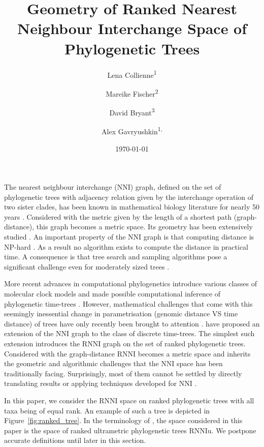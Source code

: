 \documentclass{amsart}
\title[Ranked Nearest Neighbour Intarchange]{Geometry of Ranked Nearest Neighbour Interchange Space of Phylogenetic Trees}
\date{\today}
\author{Lena Collienne\textsuperscript{1}}
\author{Mareike Fischer\textsuperscript{2}}
\author{David Bryant\textsuperscript{3}}
\author{Alex Gavryushkin\textsuperscript{1, \Letter}}
\newcommand{\nni}{\mathrm{NNI}}
\newcommand{\rnni}{\mathrm{RNNI}}
\newcommand{\rnniu}{\mathrm{RNNIu}}
\begin{document}
\maketitle

\begin{abstract}

\end{abstract}

The nearest neighbour interchange ($\nni$) graph, defined on the set of phylogenetic trees with adjacency relation given by the interchange operation of two sister clades, has been known in mathematical biology literature for nearly 50 years \autocite{Robinson1971-ql,Moore1973-kk}.
Considered with the metric given by the length of a shortest path (graph-distance), this graph becomes a metric space.
Its geometry has been extensively studied \autocite{Dasgupta2000-xa, Li1996-zw, Gordon2013-fw, De_Jong2016-al}.
An important property of the $\nni$ graph is that computing distance is NP-hard \autocite{Dasgupta2000-xa}.
As a result no algorithm exists to compute the distance in practical time.
A consequence is that tree search and sampling algorithms pose a significant challenge even for moderately sized trees \autocite{...}.

More recent advances in computational phylogenetics introduce various classes of molecular clock models \autocite{Yoder2000-ks,Drummond2006-nl,Drummond2010-yf} and made possible computational inference of phylogenetic time-trees \autocite{...}.
However, mathematical challenges that come with this seemingly inessential change in parametrisation (genomic distance VS time distance) of trees have only recently been brought to attention \autocite{Gavryushkin2016-uu}.
\textcite{Gavryushkin2018-ol} have proposed an extension of the $\nni$ graph to the class of discrete time-trees.
The simplest such extension introduces the $\rnni$ graph on the set of ranked phylogenetic trees.
Considered with the graph-distance $\rnni$ becomes a metric space and inherits the geometric and algorithmic challenges that the $\nni$ space has been traditionally facing.
Surprisingly, most of them cannot be settled by directly translating results or applying techniques developed for $\nni$ \autocite{Gavryushkin2018-ol}.

In this paper, we consider the $\rnni$ space on ranked phylogenetic trees with all taxa being of equal rank.
An example of such a tree is depicted in Figure~\ref{fig:ranked_tree}.
In the terminology of \autocite{Gavryushkin2018-ol}, the space considered in this paper is the space of ranked ultrametric phylogenetic trees $\rnniu$.
We postpone accurate definitions until later in this section.
\end{document}
